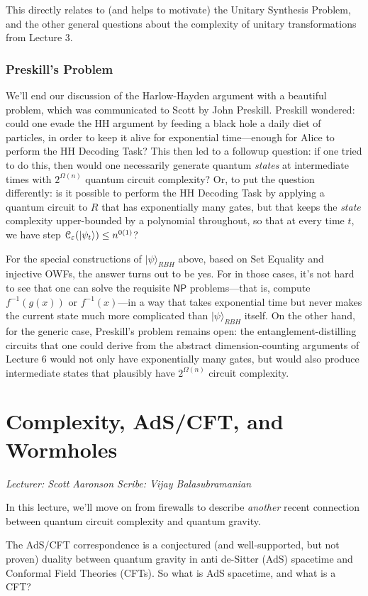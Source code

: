 \documentclass[11pt]{report}
\theoremstyle{plain}
\theoremstyle{definition}
\newcommand{\eps}{\varepsilon}
\renewcommand{\ket}[1]{|#1\rangle}
\newcommand{\lecture}[3]{%
  \chapter{#3}%
  \vspace{-5ex}%
  \textit{Lecturer: #1 \hfill Scribe: #2}\par%
  \vspace{1ex}\titlerule\vspace{2ex}}
\begin{document}
This directly relates to (and helps to motivate) the Unitary Synthesis Problem, and the other general questions about the complexity of unitary transformations from Lecture 3.

\subsection{Preskill's Problem}

We'll end our discussion of the Harlow-Hayden argument with a beautiful problem, which was communicated to Scott by John Preskill.  Preskill wondered: could one evade the HH argument by feeding a black hole a daily diet of particles, in order to keep it alive for exponential time---enough for Alice to perform the HH Decoding Task?  This then led to a followup question: if one tried to do this, then would one necessarily generate quantum {\em states} at intermediate times with $2^{\Omega(n)}$ quantum circuit complexity?  Or, to put the question differently: is it possible to perform the HH Decoding Task by applying a quantum circuit to $R$ that has exponentially many gates, but that keeps the {\em state} complexity upper-bounded by a polynomial throughout, so that at every time $t$, we have step $ {\cal C}_{{\eps}}(\ket{\psi_t}) \leq n^{0(1)}$?

For the special constructions of $\ket{\psi}_{RBH}$ above, based on Set Equality and injective OWFs, the answer turns out to be yes. For in those cases, it's not hard to see that one can solve the requisite $\mathsf{NP}$ problems---that is, compute $f^{-1}(g(x))$ or $f^{-1}(x)$---in a way that takes exponential time but never makes the current state much more complicated than $\ket{\psi}_{RBH}$ itself.  On the other hand, for the generic case, Preskill's problem remains open: the entanglement-distilling circuits that one could derive from the abstract dimension-counting arguments of Lecture 6 would not only have exponentially many gates, but would also produce intermediate states that plausibly have $2^{\Omega(n)}$ circuit complexity.



\lecture{Scott Aaronson}{Vijay Balasubramanian}{Complexity, AdS/CFT, and Wormholes}

In this lecture, we'll move on from firewalls to describe {\em another} recent connection between quantum circuit complexity and quantum gravity.

The AdS/CFT correspondence is a conjectured (and well-supported, but not proven) duality between quantum gravity in anti de-Sitter (AdS) spacetime  and Conformal Field Theories (CFTs). So what is AdS spacetime, and what is  a CFT?
\end{document}
